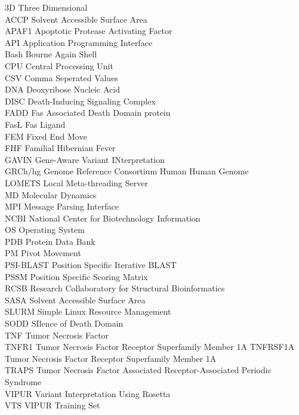 3D Three Dimensional\\
ACCP Solvent Accessible Surface Area\\
APAF1 Apoptotic Protease Activating Factor\\
API Application Programming Interface\\
Bash Bourne Again Shell\\
CPU Central Processing Unit\\
CSV Comma Seperated Values\\
DNA Deoxyribose Nucleic Acid\\
DISC Death-Inducing Signaling Complex\\
FADD Fas Associated Death Domain protein\\
FasL Fas Ligand\\
FEM Fixed End Move\\
FHF Familial Hibernian Fever\\
GAVIN Gene-Aware Variant INterpretation\\
GRCh/hg Genome Reference Consortium Human Human Genome\\
LOMETS Local Meta-threading Server\\
MD	Molecular Dynamics\\
MPI Message Parsing Interface\\
NCBI National Center for Biotechnology Information\\
OS Operating System\\
PDB Protein Data Bank\\
PM Pivot Movement\\
PSI-BLAST Position Specific Iterative BLAST\\
PSSM Position Specific Scoring Matrix\\
RCSB Research Collaboratory for Structural Bioinformatics\\
SASA Solvent Accessible Surface Area\\
SLURM Simple Linux Resource Management\\
SODD SIlence of Death Domain\\
TNF Tumor Necrosis Factor\\
TNFR1 Tumor Necrosis Factor Receptor Superfamily Member 1A
TNFRSF1A Tumor Necrosis Factor Receptor Superfamily Member 1A\\
TRAPS Tumor Necrosis Factor Associated Receptor-Associated Periodic Syndrome\\
VIPUR Variant Interpretation Using Rosetta\\
VTS VIPUR Training Set\\
